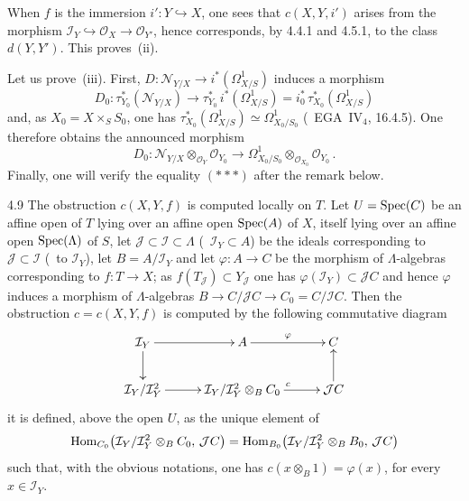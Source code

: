 When \(f\) is the immersion \(i'\colon Y\hookrightarrow X\), one sees that \(c(X,Y,i')\) arises from the morphism \(\mathcal{I}_{Y}\hookrightarrow\mathcal{O}_{X}\to\mathcal{O}_{Y'}\), hence corresponds, by 4.4.1 and 4.5.1, to the class \(d(Y,Y')\). This proves~(ii).

Let us prove~(iii). First, \(D\colon\mathcal{N}_{Y/X}\to i^{*}(\Omega^{1}_{X/S})\) induces a morphism
\[
D_{0}\colon
\tau_{Y_{0}}^{*}(\mathcal{N}_{Y/X})
\longrightarrow
\tau_{Y_{0}}^{*}\,i^{*}(\Omega^{1}_{X/S})
=
i_{0}^{*}\,\tau_{X_{0}}^{*}(\Omega^{1}_{X/S})
\]
and, as \(X_{0}=X\times_{S}S_{0}\), one has \(\tau_{X_{0}}^{*}(\Omega^{1}_{X/S})\simeq\Omega^{1}_{X_{0}/S_{0}}\) (\cf\ EGA~IV\(_{4}\), 16.4.5). One therefore obtains the announced morphism
\[
D_{0}\colon
\mathcal{N}_{Y/X}\otimes_{\mathcal{O}_{Y}}\mathcal{O}_{Y_{0}}
\longrightarrow
\Omega^{1}_{X_{0}/S_{0}}\otimes_{\mathcal{O}_{X_{0}}}\mathcal{O}_{Y_{0}}\,.
\]
Finally, one will verify the equality \((***)\) after the remark below.

\begin{remark}{4.9}
\label{III.4.9}
The obstruction \(c(X,Y,f)\) is computed locally on \(T\). Let \(U=\operatorname{Spec}(C)\) be an affine open of \(T\) lying over an affine open \(\operatorname{Spec}(A)\) of \(X\), itself lying over an affine open \(\operatorname{Spec}(\Lambda)\) of \(S\), let \(\mathcal{J}\subset\mathcal{I}\subset\Lambda\) (\resp\ \(\mathcal{I}_{Y}\subset A\)) be the ideals corresponding to \(\mathcal{J}\subset\mathcal{I}\) (\resp\ to \(\mathcal{I}_{Y}\)), let \(B=A/\mathcal{I}_{Y}\) and let \(\varphi\colon A\to C\) be the morphism of \(\Lambda\)-algebras corresponding to \(f\colon T\to X\); as \(f(T_{\mathcal{J}})\subset Y_{\mathcal{J}}\) one has \(\varphi(\mathcal{I}_{Y})\subset\mathcal{J}C\) and hence \(\varphi\) induces a morphism of \(\Lambda\)-algebras \(B\to C/\mathcal{J}C\to C_{0}=C/\mathcal{I}C\). Then the obstruction \(c=c(X,Y,f)\) is computed by the following commutative diagram
\[
\xymatrix@C=2.8em@R=2.2em{
\mathcal{I}_{Y} \ar[r] \ar[d]
& A \ar[r]^{\varphi}
& C
\\
\mathcal{I}_{Y}/\mathcal{I}_{Y}^{2} \ar[r]
& \mathcal{I}_{Y}/\mathcal{I}_{Y}^{2}\otimes_{B}C_{0} \ar[r]^{c}
& \mathcal{J}C \ar[u]
}
\]
\ie it is defined, above the open \(U\), as the unique element of
\[
\operatorname{Hom}_{C_{0}}\bigl(\mathcal{I}_{Y}/\mathcal{I}_{Y}^{2}\otimes_{B}C_{0},\,\mathcal{J}C\bigr)
=
\operatorname{Hom}_{B_{0}}\bigl(\mathcal{I}_{Y}/\mathcal{I}_{Y}^{2}\otimes_{B}B_{0},\,\mathcal{J}C\bigr)
\]
such that, with the obvious notations, one has \(c(x\otimes_{B}1)=\varphi(x)\), for every \(x\in\mathcal{I}_{Y}\).
\end{remark}
